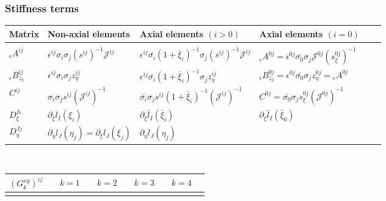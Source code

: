 \subsubsection{Stiffness terms}\label{section:stiffness}
%
\begin{table*} 
\begin{minipage}{156mm}
\begin{center}
\caption{Definitions for precomputable matrices of the stiffness term
($\epsilon=\lambda,~\mu$ or any combination thereof).}
\label{table:precomp} 
\begin{tabular}{@{}llllll}
\hline\hline
Matrix & Non-axial elements & Axial elements $(i>0)$ & Axial elements $(i=0)$\\
\hline\\
${}_{\epsilon}{A}^{ij}$  &  
$\epsilon^{ij}\sigma_i\sigma_j (s^{ij})^{-1}{\mathcal J}^{ij}$ &
$\epsilon^{ij}
\bar{\sigma_i}(1+\bar{\xi}_i)^{-1}\sigma_j (s^{ij})^{-1}{\mathcal J}^{ij}$ &
${}_\epsilon{A}^{0j}=\epsilon^{0j}
\bar{\sigma_0} \sigma_j {\mathcal J}^{0j}(s_\xi^{0j})^{-1}$ \\[10pt]
${}_\epsilon{B}_{z_\eta}^{ij}$ & 
$\epsilon^{ij}\sigma_i\sigma_j z_\eta^{ij}$ &
$\epsilon^{ij}\bar{\sigma_i}(1+\bar{\xi}_i)^{-1}\sigma_j z_\eta^{ij}$ &
${}_\epsilon{B}^{0j}_{z_\eta}=\epsilon^{0j}
\bar{\sigma_0}\sigma_j z_\eta^{0j}={}_\epsilon{A}^{0j}   $ \\[10pt]
$C^{ij}$ & 
$\sigma_i\sigma_j s^{ij} ({\mathcal J}^{ij})^{-1}$ &
$\bar{\sigma_i}\sigma_js^{ij}(1+\bar{\xi}_i)^{-1} ({\mathcal J}^{ij})^{-1}$ &
$C^{0j}=\bar{\sigma_0}\sigma_js_\xi^{0j} ({\mathcal J}^{0j})^{-1}$ \\[10pt]
$D_{\xi}^{Ii}$ & 
$\partial_\xi l_I(\xi_i)$ &
$\partial_\xi \bar{l}_I(\bar{\xi}_i)$ &
$\partial_\xi \bar{l}_I(\bar{\xi}_0)$ \\[10pt]
$D_{\eta}^{Jj}$ & 
$\partial_\eta l_J(\eta_j)=\partial_\xi l_J(\xi_j)$ &
$\partial_\eta l_J(\eta_j)$ & \\[5pt]
%
\hline\hline
\end{tabular}
%
\vspace{0.2cm}\\ 
\begin{tabular}{@{}llllll}
$(G_k^{xy})^{ij}$ &$\hspace{1em} k=1$ &$\hspace{1em} k=2$ &$\hspace{1em} k=3 $
&$\hspace{1em} k=4$ \\
\hline\vspace{0.1cm} 

\end{tabular}
\end{center}
\end{minipage}
\end{table*}
